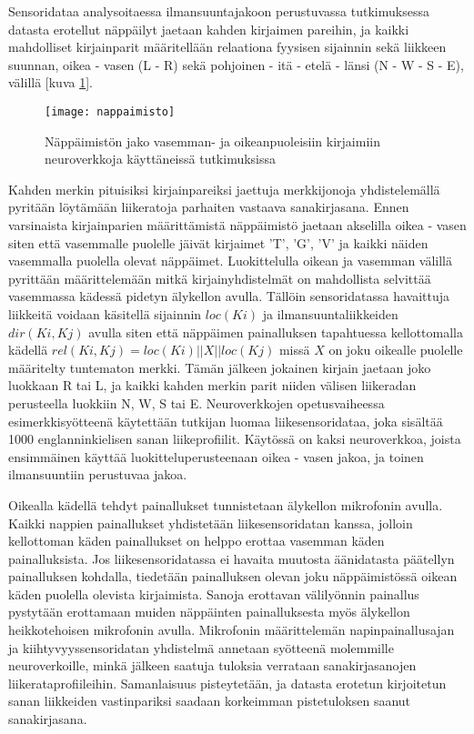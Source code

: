 \documentclass[finnish]{tktltiki2}
\theoremstyle{definition}
\theoremstyle{remark}
\begin{document}
Sensoridataa analysoitaessa ilmansuuntajakoon perustuvassa tutkimuksessa~\cite{maiti} datasta erotellut näppäilyt jaetaan kahden kirjaimen pareihin, ja kaikki mahdolliset kirjainparit määritellään relaationa fyysisen sijainnin sekä liikkeen suunnan, oikea - vasen (L - R) sekä pohjoinen - itä - etelä - länsi (N - W -
S - E), välillä [kuva \ref{fig:nappaimisto}].

\begin{figure}
\centering
\texttt{[image: nappaimisto]}
\caption{Näppäimistön jako vasemman- ja oikeanpuoleisiin kirjaimiin neuroverkkoja käyttäneissä tutkimuksissa}
\label{fig:nappaimisto}
\end{figure}
\pagebreak
Kahden merkin pituisiksi kirjainpareiksi jaettuja merkkijonoja yhdistelemällä pyritään löytämään liikeratoja parhaiten vastaava sanakirjasana. Ennen varsinaista kirjainparien määrittämistä näppäimistö jaetaan akselilla oikea - vasen siten että vasemmalle puolelle jäivät kirjaimet 'T', 'G', 'V' ja kaikki näiden vasemmalla puolella olevat näppäimet. Luokittelulla oikean ja vasemman välillä pyrittään määrittelemään mitkä kirjainyhdistelmät on mahdollista selvittää vasemmassa kädessä pidetyn älykellon avulla. Tällöin sensoridatassa havaittuja liikkeitä voidaan käsitellä sijainnin $loc(Ki)$ ja ilmansuuntaliikkeiden $dir(Ki, Kj)$ avulla siten että näppäimen painalluksen tapahtuessa kellottomalla kädellä $rel(Ki, Kj) = loc(Ki) || X || loc(Kj)$ missä $X$ on joku oikealle puolelle määritelty tuntematon merkki. Tämän jälkeen jokainen kirjain jaetaan joko luokkaan R tai L, ja kaikki kahden merkin parit niiden välisen liikeradan perusteella luokkiin N, W, S tai E.
Neuroverkkojen opetusvaiheessa esimerkkisyötteenä käytettään tutkijan luomaa liikesensoridataa, joka sisältää 1000 englanninkielisen sanan liikeprofiilit. Käytössä on kaksi neuroverkkoa, joista ensimmäinen käyttää luokitteluperusteenaan oikea - vasen jakoa, ja toinen ilmansuuntiin perustuvaa jakoa. 

Oikealla kädellä tehdyt painallukset tunnistetaan älykellon mikrofonin avulla. Kaikki nappien painallukset yhdistetään liikesensoridatan kanssa, jolloin kellottoman käden painallukset on helppo erottaa vasemman käden painalluksista. Jos liikesensoridatassa ei havaita muutosta äänidatasta päätellyn painalluksen kohdalla, tiedetään painalluksen olevan joku näppäimistössä oikean käden puolella olevista kirjaimista. Sanoja erottavan välilyönnin painallus pystytään erottamaan muiden näppäinten painalluksesta myös älykellon heikkotehoisen mikrofonin avulla. Mikrofonin määrittelemän napinpainallusajan ja kiihtyvyyssensoridatan yhdistelmä annetaan syötteenä molemmille neuroverkoille, minkä jälkeen saatuja tuloksia verrataan sanakirjasanojen liikerataprofiileihin. Samanlaisuus pisteytetään, ja datasta erotetun kirjoitetun sanan liikkeiden vastinpariksi saadaan korkeimman pistetuloksen saanut sanakirjasana. 
\end{document}
